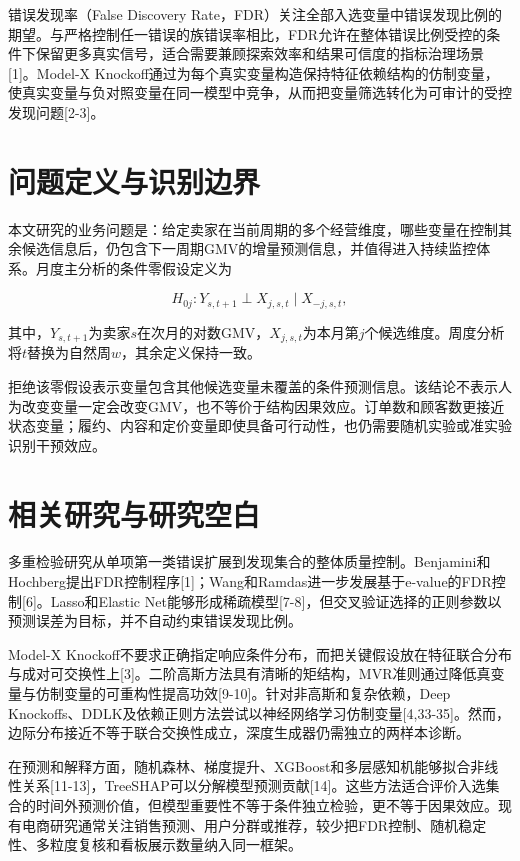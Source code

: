 \documentclass{sufethesismas}
\begin{document}
错误发现率（False Discovery Rate，FDR）关注全部入选变量中错误发现比例的期望。与严格控制任一错误的族错误率相比，FDR允许在整体错误比例受控的条件下保留更多真实信号，适合需要兼顾探索效率和结果可信度的指标治理场景{[}1{]}。Model-X Knockoff通过为每个真实变量构造保持特征依赖结构的仿制变量，使真实变量与负对照变量在同一模型中竞争，从而把变量筛选转化为可审计的受控发现问题{[}2-3{]}。

\section{问题定义与识别边界}

本文研究的业务问题是：给定卖家在当前周期的多个经营维度，哪些变量在控制其余候选信息后，仍包含下一周期GMV的增量预测信息，并值得进入持续监控体系。月度主分析的条件零假设定义为

\[
H_{0j}:Y_{s,t+1}\perp X_{j,s,t}\mid X_{-j,s,t},
\]

其中，\(Y_{s,t+1}\)为卖家\(s\)在次月的对数GMV，\(X_{j,s,t}\)为本月第\(j\)个候选维度。周度分析将\(t\)替换为自然周\(w\)，其余定义保持一致。

拒绝该零假设表示变量包含其他候选变量未覆盖的条件预测信息。该结论不表示人为改变变量一定会改变GMV，也不等价于结构因果效应。订单数和顾客数更接近状态变量；履约、内容和定价变量即使具备可行动性，也仍需要随机实验或准实验识别干预效应。

\section{相关研究与研究空白}

多重检验研究从单项第一类错误扩展到发现集合的整体质量控制。Benjamini和Hochberg提出FDR控制程序{[}1{]}；Wang和Ramdas进一步发展基于e-value的FDR控制{[}6{]}。Lasso和Elastic Net能够形成稀疏模型{[}7-8{]}，但交叉验证选择的正则参数以预测误差为目标，并不自动约束错误发现比例。

Model-X Knockoff不要求正确指定响应条件分布，而把关键假设放在特征联合分布与成对可交换性上{[}3{]}。二阶高斯方法具有清晰的矩结构，MVR准则通过降低真变量与仿制变量的可重构性提高功效{[}9-10{]}。针对非高斯和复杂依赖，Deep Knockoffs、DDLK及依赖正则方法尝试以神经网络学习仿制变量{[}4,33-35{]}。然而，边际分布接近不等于联合交换性成立，深度生成器仍需独立的两样本诊断。

在预测和解释方面，随机森林、梯度提升、XGBoost和多层感知机能够拟合非线性关系{[}11-13{]}，TreeSHAP可以分解模型预测贡献{[}14{]}。这些方法适合评价入选集合的时间外预测价值，但模型重要性不等于条件独立检验，更不等于因果效应。现有电商研究通常关注销售预测、用户分群或推荐，较少把FDR控制、随机稳定性、多粒度复核和看板展示数量纳入同一框架。
\end{document}

